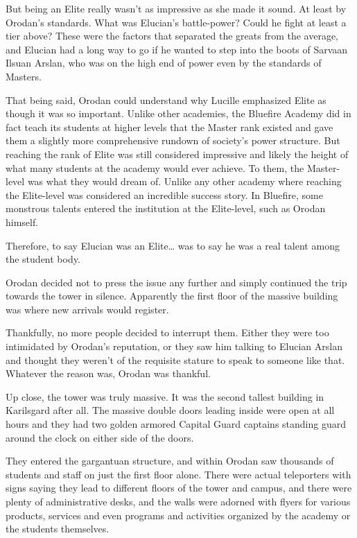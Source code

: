 \documentclass[a4paper,10pt]{book}
\begin{document}
But being an Elite really wasn’t as impressive as she made it sound. At least by Orodan’s standards. What was Elucian's battle-power? Could he fight at least a tier above? These were the factors that separated the greats from the average, and Elucian had a long way to go if he wanted to step into the boots of Sarvaan Ilsuan Arslan, who was on the high end of power even by the standards of Masters.\par
That being said, Orodan could understand why Lucille emphasized Elite as though it was so important. Unlike other academies, the Bluefire Academy did in fact teach its students at higher levels that the Master rank existed and gave them a slightly more comprehensive rundown of society’s power structure. But reaching the rank of Elite was still considered impressive and likely the height of what many students at the academy would ever achieve. To them, the Master-level was what they would dream of. Unlike any other academy where reaching the Elite-level was considered an incredible success story. In Bluefire, some monstrous talents entered the institution at the Elite-level, such as Orodan himself.\par
Therefore, to say Elucian was an Elite… was to say he was a real talent among the student body.\par
Orodan decided not to press the issue any further and simply continued the trip towards the tower in silence. Apparently the first floor of the massive building was where new arrivals would register.\par
Thankfully, no more people decided to interrupt them. Either they were too intimidated by Orodan’s reputation, or they saw him talking to Elucian Arslan and thought they weren’t of the requisite stature to speak to someone like that. Whatever the reason was, Orodan was thankful.\par
Up close, the tower was truly massive. It was the second tallest building in Karilsgard after all. The massive double doors leading inside were open at all hours and they had two golden armored Capital Guard captains standing guard around the clock on either side of the doors.\par
They entered the gargantuan structure, and within Orodan saw thousands of students and staff on just the first floor alone. There were actual teleporters with signs saying they lead to different floors of the tower and campus, and there were plenty of administrative desks, and the walls were adorned with flyers for various products, services and even programs and activities organized by the academy or the students themselves.\par
\end{document}
